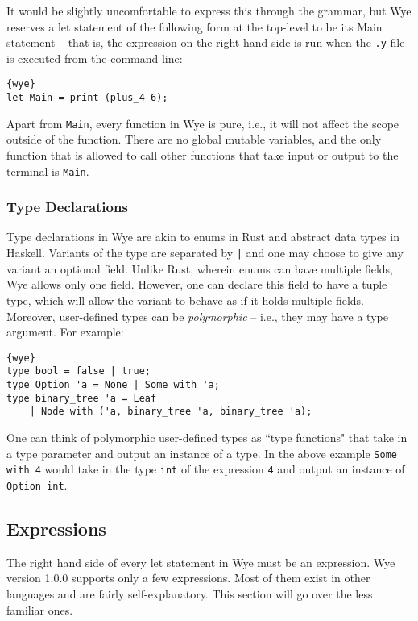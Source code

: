 \documentclass[a4paper, 12pt]{article}
\newcommand{\version}{1.0.0}
\begin{document}
It would be slightly uncomfortable to express this through the grammar, but Wye reserves a let statement of the following form at the top-level to be its Main statement -- that is, the expression on the right hand side is run when the \texttt{.y} file is executed from the command line:
\begin{lstlisting}{wye}
let Main = print (plus_4 6);
\end{lstlisting}
Apart from \texttt{Main}, every function in Wye is pure, i.e., it will not affect the scope outside of the function. There are no global mutable variables, and the only function that is allowed to call other functions that take input or output to the terminal is \texttt{Main}.

\subsubsection{Type Declarations}
Type declarations in Wye are akin to enums in Rust and abstract data types  in Haskell. Variants of the type are separated by \texttt{|} and one may choose to give any variant an optional field. Unlike Rust, wherein enums can have multiple fields, Wye allows only one field. However, one can declare this field to have a tuple type, which will allow the variant to behave as if it holds multiple fields. Moreover, user-defined types can be \textit{polymorphic} -- i.e., they may have a type argument. For example:
\begin{lstlisting}{wye}
type bool = false | true;
type Option 'a = None | Some with 'a;
type binary_tree 'a = Leaf
	| Node with ('a, binary_tree 'a, binary_tree 'a);
\end{lstlisting}
One can think of polymorphic user-defined types as ``type functions" that take in a type parameter and output an instance of a type. In the above example \texttt{Some with 4} would take in the type \texttt{int} of the expression \texttt{4} and output an instance of \texttt{Option int}.

\subsection{Expressions}
The right hand side of every let statement in Wye must be an expression. Wye version \version{} supports only a few expressions. Most of them exist in other languages and are fairly self-explanatory. This section will go over the less familiar ones.
\end{document}
